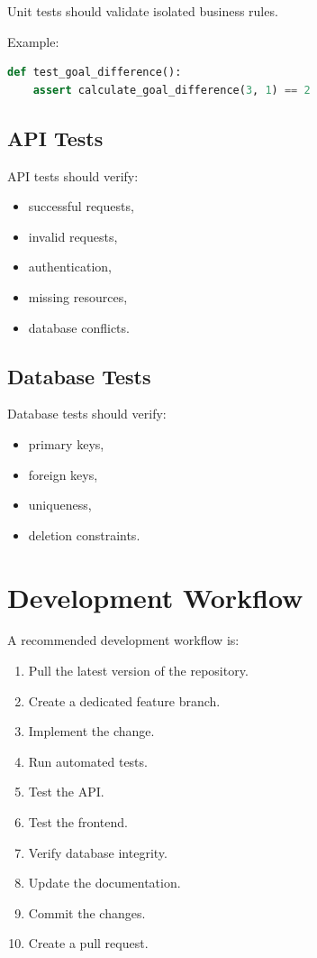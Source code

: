 \documentclass[12pt,a4paper]{article}
\begin{document}
Unit tests should validate isolated business rules.

Example:

\begin{lstlisting}[language=python]
def test_goal_difference():
    assert calculate_goal_difference(3, 1) == 2
\end{lstlisting}

\subsection{API Tests}

API tests should verify:

\begin{itemize}
    \item successful requests,
    \item invalid requests,
    \item authentication,
    \item missing resources,
    \item database conflicts.
\end{itemize}

\subsection{Database Tests}

Database tests should verify:

\begin{itemize}
    \item primary keys,
    \item foreign keys,
    \item uniqueness,
    \item deletion constraints.
\end{itemize}


\section{Development Workflow}

A recommended development workflow is:

\begin{enumerate}
    \item Pull the latest version of the repository.
    \item Create a dedicated feature branch.
    \item Implement the change.
    \item Run automated tests.
    \item Test the API.
    \item Test the frontend.
    \item Verify database integrity.
    \item Update the documentation.
    \item Commit the changes.
    \item Create a pull request.
\end{enumerate}
\end{document}
